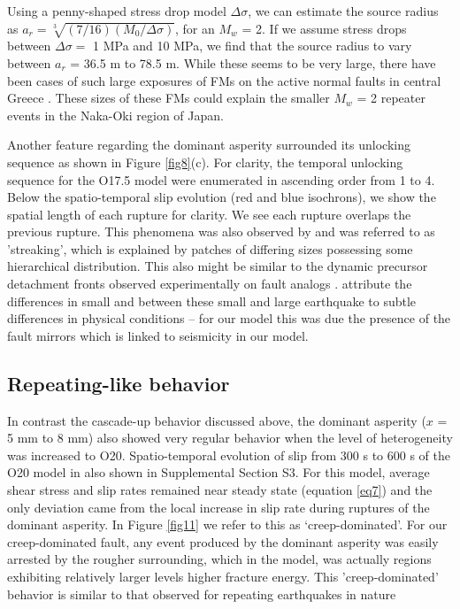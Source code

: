 \documentclass[preprint,1p, 10pt,authoryear]{elsarticle}
\begin{document}
Using a penny-shaped \citet{Eshelby1957} stress drop model $\Delta\sigma$, we can estimate the source radius as $a_{r} = \sqrt[3]{(7/16)(M_{0}/\Delta\sigma)}$, for an $M_{w}$ = 2. If we assume stress drops between $\Delta \sigma  = $ 1 MPa and 10 MPa, we find that the source radius to vary between $a_{r}$ = 36.5 m to 78.5 m.  While these seems to be very large, there have been cases of such large exposures of FMs on the active normal faults in central Greece \citep{Jackson1999}. These sizes of these FMs could explain the smaller $M_{w}$ = 2 repeater events in the Naka-Oki region of Japan.  

Another feature regarding the dominant asperity surrounded its unlocking sequence as shown in Figure \ref{fig8}(c). For clarity, the temporal unlocking sequence for the O17.5 model were enumerated in ascending order from 1 to 4.  Below the spatio-temporal slip evolution (red and blue isochrons), we show the spatial length of each rupture for clarity. We see each rupture overlaps the previous rupture. This phenomena was also observed by \citet{Okuda2018a} and was referred to as 'streaking', which is explained by patches of differing sizes possessing some hierarchical distribution. This also might be similar to the dynamic precursor detachment fronts observed experimentally on fault analogs \citep{Rubinstein2004,Rubinstein2006}. \citet{Okuda2018a} attribute the differences in small and between these small and large earthquake to subtle differences in physical conditions -- for our model this was due the presence of the fault mirrors which is linked to seismicity in our model.

\subsection{Repeating-like behavior}
In contrast the cascade-up behavior discussed above, the dominant asperity ($x$ = 5 mm to 8 mm) also showed very regular behavior when the level of heterogeneity was increased to O20.  Spatio-temporal evolution of slip from 300 s to 600 s of the O20 model in also shown in Supplemental Section S3. For this model, average shear stress and slip rates remained near steady state (equation \eqref{eq7}) and the only deviation came from the local increase in slip rate during ruptures of the dominant asperity.  In Figure \ref{fig11} we refer to this as `creep-dominated'. For our creep-dominated fault, any event produced by the dominant asperity was easily arrested by the rougher surrounding, which in the model, was actually regions exhibiting relatively larger levels higher fracture energy.  This 'creep-dominated' behavior is similar to that observed for repeating earthquakes in nature \citep[e.g., ][]{Beeler2001,Uchida2019}
\end{document}
